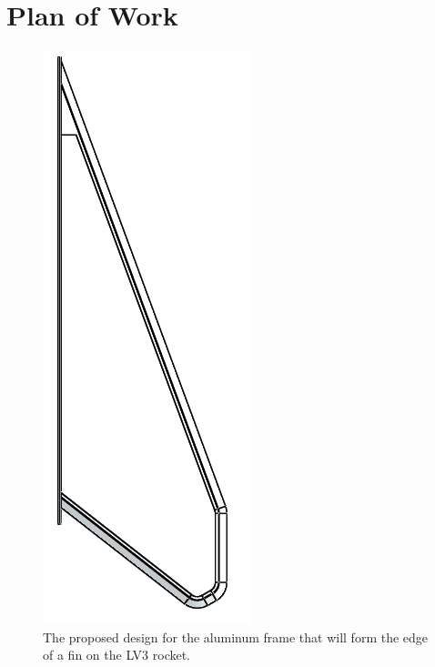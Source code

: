\documentclass{aiaa-tc}%
\begin{document}
\section{Plan of Work}
\begin{figure}
\includegraphics[width=\linewidth]{img/finFrame.png}
\caption{The proposed design for the aluminum frame that will form the edge of a fin on the LV3 rocket.}
\label{fig:finFrame}
\end{figure}
\end{document}
